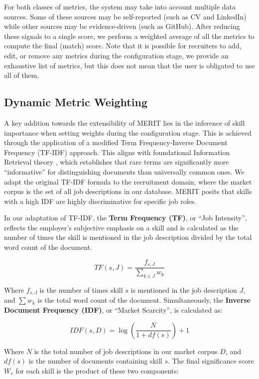 For both classes of metrics, the system may take into account multiple data sources. Some of these sources may be self-reported
(such as CV and LinkedIn) while other sources may be evidence-driven (such as GitHub). After reducing these signals to a single score,
we perform a weighted average of all the metrics to compute the final (match) score. Note that it is possible for recruiters to add,
edit, or remove any metrics during the configuration stage, we provide an exhaustive list of metrics, but this does not mean that
the user is obligated to use all of them.

\subsection{Dynamic Metric Weighting}
A key addition towards the extensibility of MERIT lies in the inference of skill importance
when setting weights during the configuration stage. This is achieved through the application of a
modified Term Frequency-Inverse Document Frequency (TF-IDF) approach. This aligns with foundational
Information Retrieval theory \cite{sparckjones1972idf}, which establishes that rare terms are
significantly more ``informative'' for distinguishing documents than universally common ones.
We adapt the original TF-IDF formula to the recruitment domain, where the market corpus is the
set of all job descriptions in our database. MERIT posits that skills with a high IDF
are highly discriminative for specific job roles.

In our adaptation of TF-IDF, the \textbf{Term Frequency (TF)}, or ``Job Intensity'', reflects the employer's subjective emphasis
on a skill and is calculated as the number of times the skill is mentioned in the job description divided by the total word count of the document.

\begin{equation}
    TF(s, J) = \frac{f_{s, J}}{\sum_{k \in J} w_k}
\end{equation}

Where $f_{s, J}$ is the number of times skill $s$ is mentioned in the job description
$J$, and $\sum w_k$ is the total word count of the document. Simultaneously, the \textbf{Inverse Document Frequency (IDF)},
or ``Market Scarcity'', is calculated as:

\begin{equation}
    IDF(s, D) = \log\left(\frac{N}{1 + df(s)}\right) + 1
\end{equation}

Where $N$ is the total number of job descriptions in our market corpus $D$, and $df(s)$ is the
number of documents containing skill $s$. The final significance score
$W_s$ for each skill is the product of these two components:

